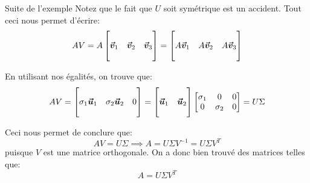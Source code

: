 \documentclass[a4paper]{article}
\begin{document}
\begin{parag}{Suite de l'exemple}
    Notez que le fait que $U$ soit symétrique est un accident. Tout ceci nous permet d'écrire:
    \[A V = A \begin{bmatrix}  &  &  \\ \bm{\protect\vec{v}}_1 & \bm{\protect\vec{v}}_2 & \bm{\protect\vec{v}}_3 \\  &  &  \end{bmatrix} = \begin{bmatrix}  &  &  \\ A \bm{\protect\vec{v}}_1 & A \bm{\protect\vec{v}}_2 & A \bm{\protect\vec{v}}_3 \\  &  &  \end{bmatrix} \]

    En utilisant nos égalités, on trouve que:
    \[AV = \begin{bmatrix}  &  &  \\ \sigma_1 \bm{\protect\vec{u}}_1 & \sigma_2 \bm{\protect\vec{u}}_2 & 0 \\  &  &  \end{bmatrix} = \begin{bmatrix}  &  \\ \bm{\protect\vec{u}}_1 & \bm{\protect\vec{u}}_2 \\  &  \end{bmatrix}  \begin{bmatrix} \sigma_1 & 0 & 0 \\ 0 & \sigma_2 & 0 \end{bmatrix} = U \Sigma \]

    Ceci nous permet de conclure que:
    \[AV = U \Sigma \implies A = U \Sigma V^{-1} = U \Sigma V^T\]
    puisque $V$ est une matrice orthogonale. On a donc bien trouvé des matrices telles que:
    \[A = U \Sigma V^T\]
\end{parag}
\end{document}
